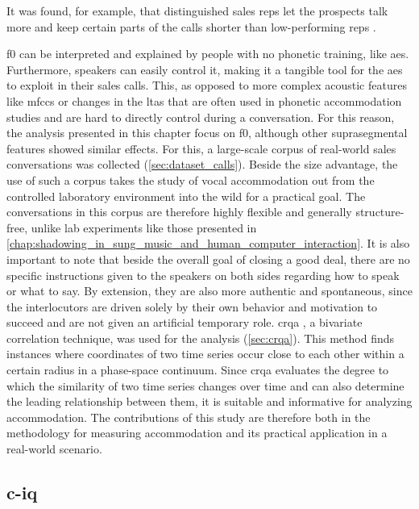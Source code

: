 It was found, for example, that distinguished sales reps let the prospects talk more and keep certain parts of the calls shorter than low-performing reps \citep{Orlob2017winning}.

\Acf{f0} can be interpreted and explained by people with no phonetic training, like \acp{ae}.
Furthermore, speakers can easily control it, making it a tangible tool for the \acp{ae} to exploit in their sales calls.
This, as opposed to more complex acoustic features like \acp{mfcc} or changes in the \ac{ltas} that are often used in phonetic accommodation studies \citep[e.g.,][]{Levitan2011measuring, Borrie2019syncing} and are hard to directly control during a conversation.
For this reason, the analysis presented in this chapter focus on \ac{f0}, although other suprasegmental features showed similar effects.
For this, a large-scale corpus of real-world sales conversations was collected (\cref{sec:dataset_calls}).
Beside the size advantage, the use of such a corpus takes the study of vocal accommodation out from the controlled laboratory environment into the wild for a practical goal.
The conversations in this corpus are therefore highly flexible and generally structure-free, unlike lab experiments like those presented in \cref{chap:shadowing_in_sung_music_and_human_computer_interaction}.
It is also important to note that beside the overall goal of closing a good deal, there are no specific instructions given to the speakers on both sides regarding how to speak or what to say.
By extension, they are also more authentic and spontaneous, since the interlocutors are driven solely by their own behavior and motivation to succeed and are not given an artificial temporary role.
\Ac{crqa} \citep{Zbilut1998detecting}, a bivariate correlation technique, was used for the analysis (\cref{sec:crqa}).
This method finds instances where coordinates of two time series occur close to each other within a certain radius in a phase-space continuum.
Since \ac{crqa} evaluates the degree to which the similarity of two time series changes over time and can also determine the leading relationship between them, it is suitable and informative for analyzing accommodation.
The contributions of this study are therefore both in the methodology for measuring accommodation and its practical application in a real-world scenario.

\subsection{\Acl{c-iq}}
\label{subsec:conversation_intelligence}

